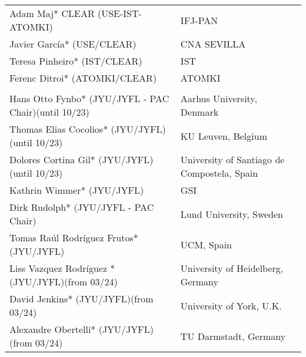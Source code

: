 \begin{longtable}{|L{0.48\textwidth}|C{0.48\textwidth}|}
      \\ \hline
    Adam Maj* CLEAR (USE-IST-ATOMKI)	& IFJ-PAN \\ \hline
    Javier García* (USE/CLEAR)	& CNA SEVILLA \\ \hline
    Teresa Pinheiro* (IST/CLEAR)	& IST \\ \hline
    Ferenc Ditroi* (ATOMKI/CLEAR)	& ATOMKI \\ \hline

      \\ \hline
    Hans Otto Fynbo* (JYU/JYFL - PAC Chair)(until 10/23)	& Aarhus University, Denmark \\ \hline
    Thomas Elias Cocolios* (JYU/JYFL)(until 10/23)	& KU Leuven, Belgium \\ \hline
    Dolores Cortina Gil* (JYU/JYFL)(until 10/23)	& University of Santiago de Compostela, Spain \\ \hline
    Kathrin Wimmer* (JYU/JYFL)	& GSI \\ \hline
    Dirk Rudolph* (JYU/JYFL - PAC Chair)	& Lund University, Sweden \\ \hline
    Tomas Raúl Rodríguez Frutos* (JYU/JYFL)	& UCM, Spain \\ \hline
    Liss Vazquez Rodríguez * (JYU/JYFL)(from 03/24)	& University of Heidelberg, Germany \\ \hline
    David Jenkins* (JYU/JYFL)(from 03/24)	& University of York, U.K. \\ \hline
    Alexandre Obertelli* (JYU/JYFL)(from 03/24)	& TU Darmstadt, Germany \\ %
\end{longtable}

